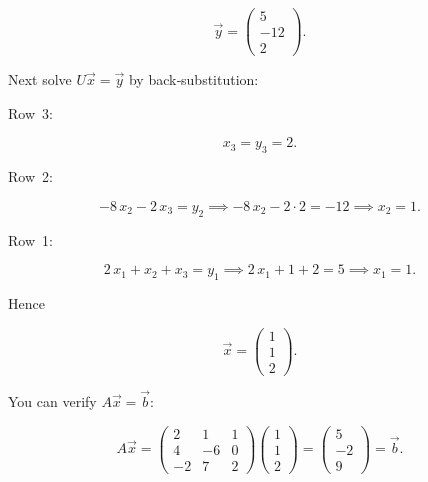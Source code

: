 \documentclass{article}
\begin{document}
\[ \vec{y} = \begin{pmatrix} 5 \\ -12 \\ 2 \end{pmatrix}. \]

Next solve $U\vec{x} = \vec{y}$ by back‑substitution:

Row 3:  

\[ x_3 = y_3 = 2. \]

Row 2:  

\[ -8\,x_2 - 2\,x_3 = y_2 \implies -8\,x_2 - 2\cdot2 = -12 \implies x_2 = 1. \]

Row 1:  

\[ 2\,x_1 + x_2 + x_3 = y_1 \implies 2\,x_1 + 1 + 2 = 5 \implies x_1 = 1. \]

Hence

\[ \vec{x} = \begin{pmatrix} 1 \\ 1 \\ 2 \end{pmatrix}. \]

You can verify $A \vec{x} = \vec{b}$:

\[ A \vec{x} = \begin{pmatrix}
2 & 1 & 1 \\
4 & -6 & 0 \\
-2 & 7 & 2
\end{pmatrix}
\begin{pmatrix} 1 \\ 1 \\ 2 \end{pmatrix}
=
\begin{pmatrix} 5 \\ -2 \\ 9 \end{pmatrix}
= \vec{b}. \]
\end{document}
